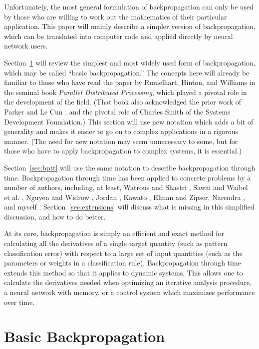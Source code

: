 \documentclass[journal]{IEEEtran} %
\begin{document}
Unfortunately, the most general formulation of backpropagation can only be used by those who are willing to work out the mathematics of their particular application. This paper will mainly describe a simpler version of backpropagation, which can be translated into computer code and applied directly by neural network users.

Section~\ref{sec:basic_bp} will review the simplest and most widely used form of backpropagation, which may be called ``basic backpropagation.'' The concepts here will already be familiar to those who have read the paper by Rumelhart, Hinton, and Williams \cite{Rumelhart:1986} in the seminal book \emph{Parallel Distributed Processing}, which played a pivotal role in the development of the field. (That book also acknowledged the prior work of Parker \cite{Parker:1985} and Le Cun \cite{LeCun:1985}, and the pivotal role of Charles Smith of the Systems Development Foundation.) This section will use new notation which adds a bit of generality and makes it easier to go on to complex applications in a rigorous manner. (The need for new notation may seem unnecessary to some, but for those who have to apply backpropagation to complex systems, it is essential.)

Section~\ref{sec:bptt} will use the same notation to describe backpropagation through time. Backpropagation through time has been applied to concrete problems by a number of authors, including, at least, Watrous and Shastri \cite{Watrous:1987}, Sawai and Waibel et al. \cite{Sawai:1989}, Nguyen and Widrow \cite{Nguyen:1990}, Jordan \cite{Jordan:1989}, Kawato \cite{Kawato:1990}, Elman and Zipser, Narendra \cite{Narendra:1990}, and myself \cite{Werbos:1974, Werbos:1987b, Werbos:1988, Werbos:1990}. Section~\ref{sec:extensions} will discuss what is missing in this simplified discussion, and how to do better.

At its core, backpropagation is simply an efficient and exact method for calculating all the derivatives of a single target quantity (such as pattern classification error) with respect to a large set of input quantities (such as the parameters or weights in a classification rule). Backpropagation through time extends this method so that it applies to dynamic systems. This allows one to calculate the derivatives needed when optimizing an iterative analysis procedure, a neural network with memory, or a control system which maximizes performance over time.

\section{Basic Backpropagation}
\label{sec:basic_bp}
\end{document}

